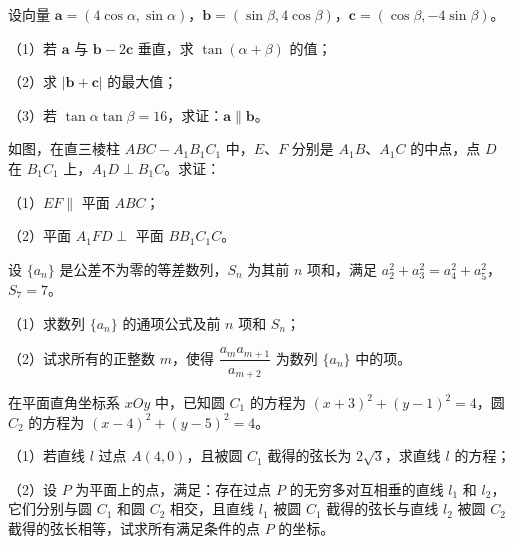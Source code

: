 \begin{question}
设向量 $\boldsymbol a=(4\cos\alpha,\sin\alpha)$，$\boldsymbol b=(\sin\beta,4\cos\beta)$，$\boldsymbol c=(\cos\beta,-4\sin\beta)$。

（1）若 $\boldsymbol a$ 与 $\boldsymbol b-2\boldsymbol c$ 垂直，求 $\tan(\alpha+\beta)$ 的值；

（2）求 $|\boldsymbol b+\boldsymbol c|$ 的最大值；

（3）若 $\tan\alpha\tan\beta=16$，求证：$\boldsymbol a\parallel\boldsymbol b$。

\Needspace{0.4\textheight}
\end{question}
\begin{question}
如图，在直三棱柱 $ABC-A_1B_1C_1$ 中，$E$、$F$ 分别是 $A_1B$、$A_1C$ 的中点，点 $D$ 在 $B_1C_1$ 上，$A_1D\perp B_1C$。求证：

（1）$EF\parallel$ 平面 $ABC$；

（2）平面 $A_1FD\perp$ 平面 $BB_1C_1C$。
\nopagebreak[4]
\begin{center}\end{center}
\nopagebreak[4]
\end{question}
\begin{question}
设 $\{a_n\}$ 是公差不为零的等差数列，$S_n$ 为其前 $n$ 项和，满足 $a_2^2+a_3^2=a_4^2+a_5^2$，$S_7=7$。

（1）求数列 $\{a_n\}$ 的通项公式及前 $n$ 项和 $S_n$；

（2）试求所有的正整数 $m$，使得 $\dfrac{a_ma_{m+1}}{a_{m+2}}$ 为数列 $\{a_n\}$ 中的项。

\Needspace{0.4\textheight}
\end{question}
\begin{question}
在平面直角坐标系 $xOy$ 中，已知圆 $C_1$ 的方程为 $(x+3)^2+(y-1)^2=4$，圆 $C_2$ 的方程为 $(x-4)^2+(y-5)^2=4$。

（1）若直线 $l$ 过点 $A(4,0)$，且被圆 $C_1$ 截得的弦长为 $2\sqrt3$，求直线 $l$ 的方程；

（2）设 $P$ 为平面上的点，满足：存在过点 $P$ 的无穷多对互相垂的直线 $l_1$ 和 $l_2$，它们分别与圆 $C_1$ 和圆 $C_2$ 相交，且直线 $l_1$ 被圆 $C_1$ 截得的弦长与直线 $l_2$ 被圆 $C_2$ 截得的弦长相等，试求所有满足条件的点 $P$ 的坐标。
\nopagebreak[4]
\begin{center}\end{center}
\nopagebreak[4]
\end{question}

